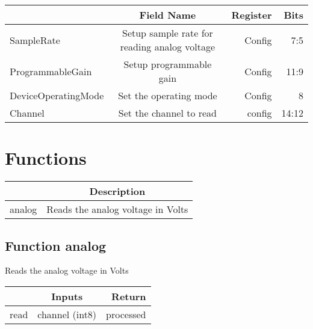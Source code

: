 \documentclass[a4paper,12pt,oneside,pdflatex,italian,final,twocolumn]{article}
\begin{document}
\centering
\begin{tabular}{lcrr}
\toprule
  & Field Name & Register & Bits \\
\midrule
SampleRate & Setup sample rate for reading analog voltage & Config &
7:5
\\

ProgrammableGain & Setup programmable gain & Config &
11:9
\\

DeviceOperatingMode & Set the operating mode & Config &
8
\\

Channel & Set the channel to read & config &
14:12
\\

\bottomrule
\end{tabular}

\raggedright


\section{Functions}

\centering
\begin{tabular}{lc}
\toprule
  & Description \\
\midrule
analog & Reads the analog voltage in Volts \\
\bottomrule
\end{tabular}


\raggedright
\subsection{Function analog }
Reads the analog voltage in Volts \\

\centering
\begin{tabular}{lcr}
\toprule
  & Inputs & Return \\
\midrule
read &
channel (int8)

&
processed
\\
\bottomrule
\end{tabular}



\raggedright
\end{document}
